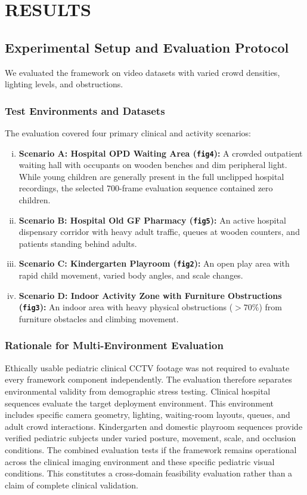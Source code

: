 \chapter{RESULTS}

\section{Experimental Setup and Evaluation Protocol}
We evaluated the framework on video datasets with varied crowd densities, lighting levels, and obstructions.

\subsection{Test Environments and Datasets}
The evaluation covered four primary clinical and activity scenarios:
\begin{enumerate}[(i)]
    \item \textbf{Scenario A: Hospital OPD Waiting Area (\texttt{fig4}):} A crowded outpatient waiting hall with occupants on wooden benches and dim peripheral light. While young children are generally present in the full unclipped hospital recordings, the selected 700-frame evaluation sequence contained zero children.
    \item \textbf{Scenario B: Hospital Old GF Pharmacy (\texttt{fig5}):} An active hospital dispensary corridor with heavy adult traffic, queues at wooden counters, and patients standing behind adults.
    \item \textbf{Scenario C: Kindergarten Playroom (\texttt{fig2}):} An open play area with rapid child movement, varied body angles, and scale changes.
    \item \textbf{Scenario D: Indoor Activity Zone with Furniture Obstructions (\texttt{fig3}):} An indoor area with heavy physical obstructions ($>70\%$) from furniture obstacles and climbing movement.
\end{enumerate}

\subsection{Rationale for Multi-Environment Evaluation}
Ethically usable pediatric clinical CCTV footage was not required to evaluate every framework component independently. The evaluation therefore separates environmental validity from demographic stress testing. Clinical hospital sequences evaluate the target deployment environment. This environment includes specific camera geometry, lighting, waiting-room layouts, queues, and adult crowd interactions. Kindergarten and domestic playroom sequences provide verified pediatric subjects under varied posture, movement, scale, and occlusion conditions. The combined evaluation tests if the framework remains operational across the clinical imaging environment and these specific pediatric visual conditions. This constitutes a cross-domain feasibility evaluation rather than a claim of complete clinical validation.
